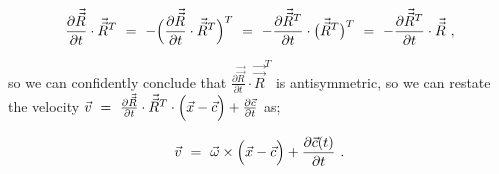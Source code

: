 \documentclass{article}
\newcounter{subsubsubsection}[subsubsection]
\begin{document}
\begin{equation} \label{eq:1}
\frac{\partial{\vec{\vec{R}}}}{\partial{t}} \cdot  \vec{\vec{R}}^{T} \hspace{0.125cm} = \hspace{0.125cm} - \Big( \frac{\partial{\vec{\vec{R}}}}{\partial{t}} \cdot  \vec{\vec{R}}^{T} \Big)^{T}  \hspace{0.125cm} = \hspace{0.125cm} - \frac{\partial{\vec{\vec{R}}^{T}}}{\partial{t}} \cdot \big( \vec{\vec{R}}^{T} \big)^{T}  \hspace{0.125cm} = \hspace{0.125cm} - \frac{\partial{\vec{\vec{R}}^{T}}}{\partial{t}} \cdot \vec{\vec{R}} \hspace{0.125cm} ,
\end{equation}

so we can confidently conclude that \begin{math} \frac{\partial{\vec{\vec{R}}}}{\partial{t}} \cdot  \vec{\vec{R}}^{T} \end{math} is antisymmetric, so we can restate the velocity \begin{math} \vec{v} \hspace{0.125cm} = \hspace{0.125cm} \frac{\partial{\vec{\vec{R}}}}{\partial{t}} \cdot  \vec{\vec{R}}^{T} \cdot \Big( \vec{x} - \vec{c} \Big) + \frac{\partial{\vec{c}}}{\partial{t}} \end{math} as;

\begin{equation} \label{eq:1}
\vec{v}  \hspace{0.125cm} =  \hspace{0.125cm} \vec{\omega} \times \Big( \vec{x} - \vec{c} \Big) + \frac{\partial{\vec{c}(t)}}{\partial{t}} \hspace{0.125cm} . 
\end{equation}

\end{document}
